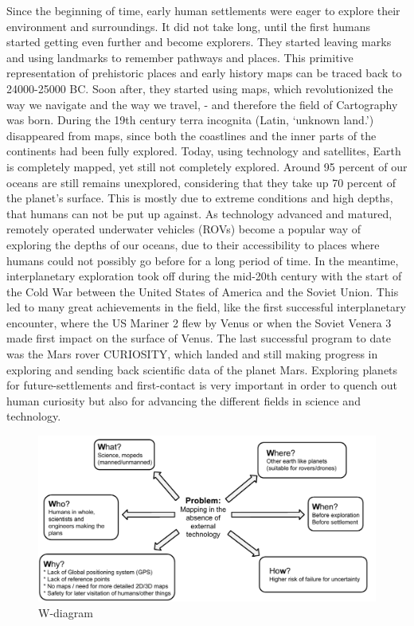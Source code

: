 Since the beginning of time, early human settlements were eager to explore their environment and surroundings. It did not take long, until the first humans started getting even further and become explorers. They started leaving marks and using landmarks to remember pathways and places. This primitive representation of prehistoric places and early history maps can be traced back to 24000-25000 BC\cite{cavedrawings}. Soon after, they started using maps, which revolutionized the way we navigate and the way we travel, - and therefore the field of Cartography was born. During the 19th century terra incognita (Latin, ‘unknown land.’) disappeared from maps, since both the coastlines and the inner parts of the continents had been fully explored. Today, using technology and satellites, Earth is completely mapped, yet still not completely explored. Around 95 percent of our oceans are still remains unexplored, considering that they take up 70 percent of the planet's surface\cite{oceandepth}. This is mostly due to extreme conditions and high depths, that humans can not be put up against. As technology advanced and matured, remotely operated underwater vehicles (ROVs) become a popular way of exploring the depths of our oceans, due to their accessibility to places where humans could not possibly go before for a long period of time. In the meantime, interplanetary exploration took off during the mid-20th century with the start of the Cold War between the United States of America and the Soviet Union. This led to many great achievements in the field, like the first successful interplanetary encounter, where the US Mariner 2 flew by Venus\cite{firstflyby} or when the Soviet Venera 3 made first impact on the surface of Venus\cite{firstimpact}. The last successful program to date was the Mars rover CURIOSITY, which landed and still making progress in exploring and sending back scientific data of the planet Mars. Exploring planets for future-settlements and first-contact is very important in order to quench out human curiosity but also for advancing the different fields in science and technology.

\clearpage

\begin{figure}[!h]
	\centering
	\includegraphics[scale=.7]{images/wdiagram1.pdf}
	\caption{W-diagram}
	\label{fig:wdiagram}
\end{figure}


